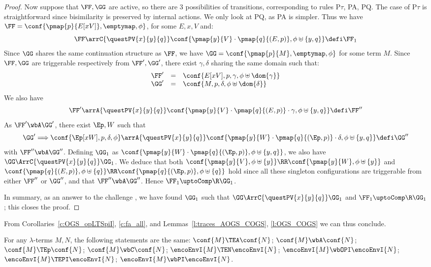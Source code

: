 \begin{proof}
  \noindent
  Now suppose that $\FF,\GG$ are active,
  so there are 3 possibilities of transitions, corresponding to rules 
  P$\tau$, PA, PQ. The case of 
  P$\tau$ is straightforward since bisimilarity is preserved by internal
  actions.  We only look at PQ, as PA is simpler. 
  Thus we have 
  $\FF = \conf{\pmap{p}{E[x V]},\emptymap,\phi}$, for some $E,x,V$ and: 
  \begin{equation}
  \label{e:KpqH}
   \FF  \arrC{\questPV{x}{y}{q}} 
        \conf{\pmap{y}{V} \cdot \pmap{q}{(E,p)}, \phi \uplus \{y,q\}} 
        \defi \FF_1
  \end{equation} 
  Since $\GG$ shares the same continuation structure as $\FF$,
  we have $\GG = \conf{\pmap{p}{M},\emptymap,\phi}$ for some term $M$.
  Since $\FF,\GG$ are triggerable respectively from $\FF',\GG'$,
  there exist $\gamma,\delta$ sharing the same domain such that:  
  \[\begin{array}{rcl}
    \FF' & = & \conf{E[x V], p, \gamma, \phi\uplus\dom{\gamma}} \\ 
    \GG' & = & \conf{M, p, \delta, \phi\uplus\dom{\delta}} 
  \end{array}\]
  We also have 
  \[
  \FF' \arrA{\questPV{x}{y}{q}} 
   \conf{ \pmap{y}{V} \cdot \pmap{q}{(E,p)} \cdot \gamma, \phi  \uplus \{y,q\}}
   \defi \FF''
  \]
  As $\FF' \wbA \GG'$, there exist $\Ep,W$ such that 
  \[
  \GG'  \Longrightarrow 
   \conf{\Ep[x W],p,\delta,\phi}
  \arrA{\questPV{x}{y}{q}} 
  \conf{\pmap{y}{W} \cdot \pmap{q}{(\Ep,p)} \cdot \delta, \phi \uplus \{y,q\}} 
  \defi \GG''
  \]
  with
  $\FF'' \wbA \GG''$. 
  Defining $\GG_1$ as
  $\conf{\pmap{y}{W} \cdot \pmap{q}{(\Ep,p)}, \phi \uplus \{y,q\}}$,
  we also have $\GG \ArrC{\questPV{x}{y}{q}} \GG_1$. 
  We deduce that both 
  $\conf{ \pmap{y}{V},\phi \uplus \{y\}} 
   \RR
   \conf{ \pmap{y}{W},\phi \uplus\{y\}}$ 
  and 
  $\conf{ \pmap{q}{(E,p)},\phi \uplus \{q\}}
   \RR
   \conf{ \pmap{q}{(\Ep,p)},\phi \uplus \{q\}}$ hold
   since all these singleton configurations
   are triggerable from either $\FF''$ or $\GG''$,
   and that $\FF'' \wbA \GG''$.
  Hence $\FF_1 \uptoComp \R  \GG_1$.
  
  In summary, as an answer to the challenge 
  , we have found  $\GG_1$ such that 
   $\GG \ArrC{\questPV{x}{y}{q}}
   \GG_1$ and  
  $\FF_1 \uptoComp \R  \GG_1$; this closes the proof.
\end{proof} 

\noindent
From Corollaries~\ref{c:OGS_opLTSpiI}, \ref{c:fa_all}, and 
Lemmas~\ref{l:traces_AOGS_COGS}, \ref{l:OGS_COGS} we can thus conclude. 
\begin{corollary}
\label{c:OGS_COGS}
For any $\lambda$-terms $M,N$, the following statements are the same: 
$\conf{M} \TEA \conf {N}$;
$\conf{M} \wbA \conf {N}$;
$\conf{M} \TEp \conf {N}$;
$\conf{M} \wbC \conf {N}$;
$\encoEnvI {{M} } \TEN\encoEnvI {{N}}$; 
$\encoEnvI {{M}} \wbOPI \encoEnvI {{N}}$; 
$\encoEnvI {{M} } \TEPI\encoEnvI {{N}}$; 
$\encoEnvI {{M}} \wbPI \encoEnvI {{N}}$. 
\end{corollary} 